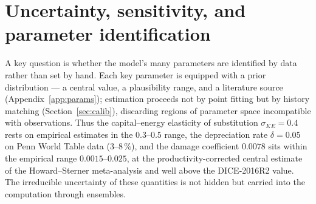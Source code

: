 \documentclass[a4paper,fleqn]{cas-sc}
\begin{document}
\section{Uncertainty, sensitivity, and parameter identification}
\label{sec:uq}

A key question is whether the model's many parameters are identified by data rather than set by
hand. Each key parameter is equipped with a prior distribution --- a central value, a plausibility
range, and a literature source (Appendix~\ref{app:params}); estimation proceeds not by point fitting
but by history matching (Section~\ref{sec:calib}), discarding regions of parameter space
incompatible with observations. Thus the capital--energy elasticity of substitution
$\sigma_{KE}=0.4$ rests on empirical estimates in the $0.3$--$0.5$ range, the depreciation rate
$\delta=0.05$ on Penn World Table data ($3$--$8\,\%$), and the damage coefficient $0.0078$ sits
within the empirical range $0.0015$--$0.025$, at the productivity-corrected central estimate of the
Howard--Sterner meta-analysis and well above the DICE-2016R2 value. The irreducible uncertainty of
these quantities is not hidden but carried into the computation through ensembles.
\end{document}
